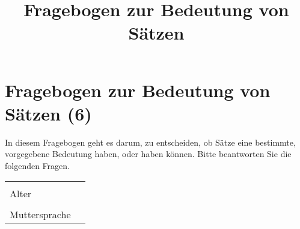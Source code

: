 \documentclass[a4paper, 8pt]{article}
\title{Fragebogen zur Bedeutung von Sätzen}
\begin{document}
\section*{Fragebogen zur Bedeutung von Sätzen (6)}

In diesem Fragebogen geht es darum, zu entscheiden, ob Sätze eine bestimmte, vorgegebene Bedeutung haben, oder haben können. Bitte beantworten Sie die folgenden Fragen.


\begin{tabular}{|l|p{5cm}|}
\hline
& \\
Alter & \\
\hline
& \\
Muttersprache & \\
\hline
\end{tabular}
\end{document}
